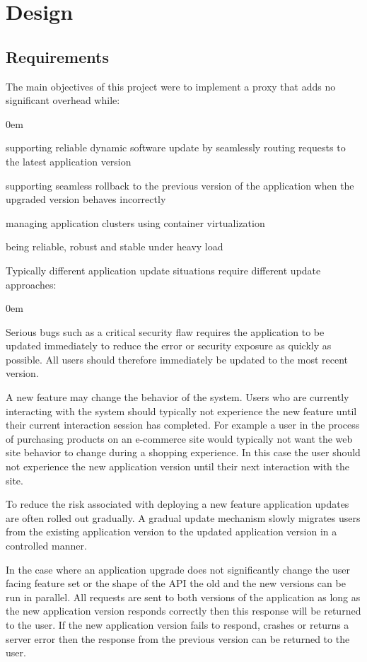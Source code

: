 \documentclass[a4paper,11pt,twoside]{report}
\begin{document}
\clearpage

\chapter{Design}\label{Design}
\section{Requirements}\label{requirements} 

The main objectives of this project were to implement a proxy that adds no significant overhead while:
\begin{list}{-}{}
\itemsep0em
\item supporting reliable dynamic software update by seamlessly routing requests to the latest application version
\item supporting seamless rollback to the previous version of the application when the upgraded version behaves incorrectly  
\item managing application clusters using container virtualization
\item being reliable, robust and stable under heavy load
\end{list}

\noindent
Typically different application update situations require different update approaches:
\begin{list}{-}{}
\itemsep0em
\item Serious bugs such as a critical security flaw requires the application to be updated immediately to reduce the error or security exposure as quickly as possible.  All users should therefore immediately be updated to the most recent version.
\item A new feature may change the behavior of the system.  Users who are currently interacting with the system should typically not experience the new feature until their current interaction session has completed.  For example a user in the process of purchasing products on an e-commerce site would typically not want the web site behavior to change during a shopping experience.  In this case the user should not experience the new application version until their next interaction with the site.
\item To reduce the risk associated with deploying a new feature application updates are often rolled out gradually.  A gradual update mechanism slowly migrates users from the existing application version to the updated application version in a controlled manner.
\item In the case where an application upgrade does not significantly change the user facing feature set or the shape of the API the old and the new versions can be run in parallel.  All requests are sent to both versions of the application as long as the new application version responds correctly then this response will be returned to the user.  If the new application version fails to respond, crashes or returns a server error then the response from the previous version can be returned to the user.
\end{list}
\end{document}
